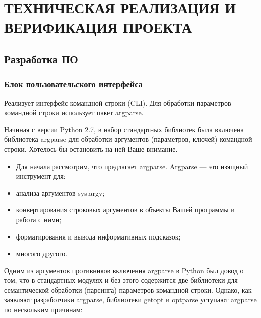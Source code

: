 \lstset{style=pythonstyle}

\section{ТЕХНИЧЕСКАЯ РЕАЛИЗАЦИЯ И ВЕРИФИКАЦИЯ ПРОЕКТА}
\label{sec:func}

\subsection{Разработка ПО}
\label{sub:func:1}

\subsubsection{Блок пользовательского интерфейса }


Реализует интерфейс командной строки (CLI). Для обработки параметров командной строки использует пакет argparse.

Начиная с версии Python 2.7, в набор стандартных библиотек была включена библиотека argparse для обработки аргументов (параметров, ключей) командной строки. Хотелось бы остановить на ней Ваше внимание.

\begin{itemize}

	\item Для начала рассмотрим, что предлагает argparse. Argparse — это изящный инструмент для:
	\item анализа аргументов sys.argv;
	\item конвертирования строковых аргументов в объекты Вашей программы и работа с ними;
	\item форматирования и вывода информативных подсказок;
	\item многого другого.

\end{itemize}


Одним из аргументов противников включения argparse в Python был довод о том, что в стандартных модулях и без этого содержится две библиотеки для семантической обработки (парсинга) параметров командной строки. Однако, как заявляют разработчики argparse, библиотеки getopt и optparse уступают argparse по нескольким причинам:

